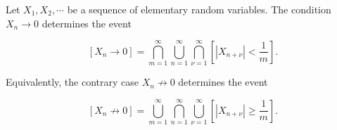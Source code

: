 Let $X_1, X_2, \cdots$ be a sequence of elementary random variables. The condition $X_n \to 0$ determines the event

$$[X_n \to 0] = \bigcap_{m=1}^{\infty} \bigcup_{n=1}^{\infty} \bigcap_{\nu=1}^{\infty} \left[|X_{n+\nu}| < \frac{1}{m}\right].$$

Equivalently, the contrary case $X_n \not\to 0$ determines the event

$$[X_n \not\to 0] = \bigcup_{m=1}^{\infty} \bigcap_{n=1}^{\infty} \bigcup_{\nu=1}^{\infty} \left[|X_{n+\nu}| \geq \frac{1}{m}\right].$$
